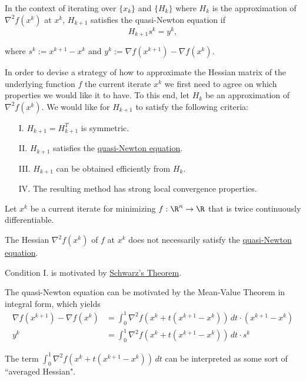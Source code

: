 \label{cc538a4}

In the context of iterating over $\{x_k\}$ and $\{H_k\}$ where $H_k$ is the
approximation of $\nabla^2f(x^k)$ at $x^k$, $H_{k+1}$ satisfies the
quasi-Newton equation if
$$
  H_{k+1}s^k=y^k,
$$

where $s^k:=x^{k+1}-x^k$ and $y^k:=\nabla f(x^{k+1})-\nabla f(x^k)$.

\label{f25ca2a}

In order to devise a strategy of how to approximate the Hessian matrix of the
underlying function $f$ the current iterate $x^k$ we first need to agree on
which properties we would like it to have. To this end, let $H_k$ be an
approximation of $\nabla^2f(x^k)$. We would like for $H_{k+1}$ to satisfy the
following criteria:
\begin{enumerate}
  \item [I.] $H_{k+1}=H_{k+1}^T$ is symmetric.
  \item [II.] $H_{k+1}$ satisfies the \href{cc538a4}{quasi-Newton equation}.
  \item [III.] $H_{k+1}$ can be obtained efficiently from $H_k$.
  \item [IV.] The resulting method has strong local convergence properties.
\end{enumerate}

\label{b19fe28}

Let $x^k$ be a current iterate for minimizing $f:\R^n\to\R$ that is twice
continuously differentiable.
\begin{enumerata}
  \item The Hessian $\nabla^2f(x^k)$ of $f$ at $x^k$ does not necessarily satisfy the
  \href{cc538a4}{quasi-Newton equation}.
  \item Condition I. is motivated by \href{c3524e9}{Schwarz's Theorem}.
  \item The quasi-Newton equation can be motivated by the Mean-Value Theorem in
  integral form, which yields
  \begin{align*}
    \nabla f(x^{k+1})-\nabla f(x^k)
        &=\int_0^1\nabla^2f(x^k+t(x^{k+1}-x^k))\,dt\cdot(x^{k+1}-x^k) \\
    y^k &=\int_0^1\nabla^2f(x^k+t(x^{k+1}-x^k))\,dt\cdot s^k
  \end{align*}

  The term $\int_0^1\nabla^2f(x^k+t(x^{k+1}-x^k))\,dt$ can be interpreted as some
  sort of ``averaged Hessian".
\end{enumerata}

